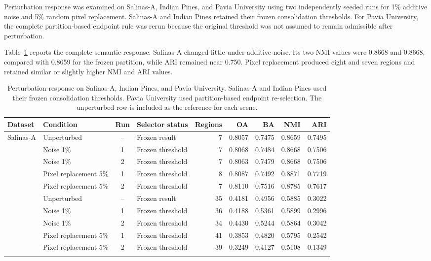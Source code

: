 \documentclass[10pt,a4paper,fleqn]{article}
\begin{document}
Perturbation response was examined on Salinas-A, Indian Pines, and Pavia
University using two independently seeded runs for 1\% additive noise and
5\% random pixel replacement. Salinas-A and Indian Pines retained their frozen
consolidation thresholds. For Pavia University, the complete partition-based
endpoint rule was rerun because the original threshold was not assumed to
remain admissible after perturbation.

Table~\ref{tab:perturbation_results} reports the complete semantic response.
Salinas-A changed little under additive noise. Its two NMI values were 0.8668
and 0.8668, compared with 0.8659 for the frozen partition, while ARI remained
near 0.750. Pixel replacement produced eight and seven regions and retained
similar or slightly higher NMI and ARI values.

\begin{table}[!t]
\centering
\scriptsize
\caption{Perturbation response on Salinas-A, Indian Pines, and Pavia
University. Salinas-A and Indian Pines used their frozen consolidation
thresholds. Pavia University used partition-based endpoint re-selection. The
unperturbed row is included as the reference for each scene.}
\label{tab:perturbation_results}

\renewcommand{\arraystretch}{0.98}
\setlength{\tabcolsep}{3.5pt}

\begin{tabular}{@{}llclrrrrr@{}}
\toprule
Dataset &
Condition &
Run &
Selector status &
Regions &
OA &
BA &
NMI &
ARI \\
\midrule

\multirow{5}{*}{Salinas-A}
& Unperturbed & -- & Frozen result & 7
& 0.8057 & 0.7475 & 0.8659 & 0.7495 \\
& Noise 1\% & 1 & Frozen threshold & 7
& 0.8068 & 0.7484 & 0.8668 & 0.7506 \\
& Noise 1\% & 2 & Frozen threshold & 7
& 0.8063 & 0.7479 & 0.8668 & 0.7506 \\
& Pixel replacement 5\% & 1 & Frozen threshold & 8
& 0.8087 & 0.7492 & 0.8871 & 0.7719 \\
& Pixel replacement 5\% & 2 & Frozen threshold & 7
& 0.8110 & 0.7516 & 0.8785 & 0.7617 \\
\addlinespace[2pt]

\multirow{5}{*}{Indian Pines}
& Unperturbed & -- & Frozen result & 35
& 0.4181 & 0.4956 & 0.5885 & 0.3022 \\
& Noise 1\% & 1 & Frozen threshold & 36
& 0.4188 & 0.5361 & 0.5899 & 0.2996 \\
& Noise 1\% & 2 & Frozen threshold & 34
& 0.4430 & 0.5244 & 0.5864 & 0.3042 \\
& Pixel replacement 5\% & 1 & Frozen threshold & 41
& 0.3853 & 0.4820 & 0.5795 & 0.2542 \\
& Pixel replacement 5\% & 2 & Frozen threshold & 39
& 0.3249 & 0.4127 & 0.5108 & 0.1349 \\
\addlinespace[2pt]


\end{tabular}
\end{table}
\end{document}
